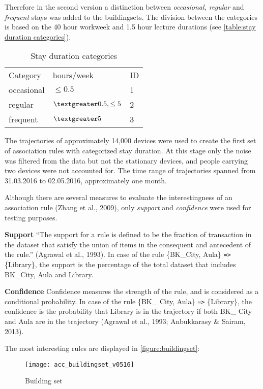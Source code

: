 Therefore in the second version a distinction between \textit{occasional,
regular} and \textit{frequent} stays was added to the buildingsets. The division
between the categories is based on the 40 hour workweek and 1.5 hour lecture
durations (see \autoref{table:stay duration categories}). 

\begin{table}[H]
\centering
\captionsetup{justification=centering}
\caption{Stay duration categories}
\label{table:stay duration categories}
\begin{tabular}{lll}
\cline{1-3}
Category   & hours/week           	& ID \\ \cline{1-3}
occasional & $\leq 0.5$             	& 1  \\
regular	& $\textgreater 0.5, \leq 5$ & 2  \\
frequent   & $\textgreater 5$       	& 3
\end{tabular}
\end{table}

The trajectories of approximately 14,000 devices were used to create the first set of association rules with categorized stay duration. At this stage only the noise was filtered from the data but not the stationary devices, and people carrying two devices were not accounted for. The time range of trajectories spanned from 31.03.2016 to 02.05.2016, approximately one month.

Although there are several measures to evaluate the interestingness of an association rule  (Zhang et al., 2009), only \textit{support} and \textit{confidence} were used for testing purposes. 

\textbf{Support}
“The support for a rule is defined to be the fraction of transaction in the dataset that satisfy the union of items in the consequent and antecedent of the rule.” (Agrawal et al., 1993). In case of the rule \{BK\_City, Aula\} \verb|=>| \{Library\}, the support is the percentage of the total dataset that includes BK\_City, Aula and Library.

\textbf{Confidence}
Confidence measures the strength of the rule, and is considered as a conditional probability. In case of the rule \{BK\_ City, Aula\} \verb|=>| \{Library\}, the confidence is the probability that Library is in the trajectory if both BK\_ City and Aula are in the trajectory (Agrawal et al., 1993; Anbukkarasy \& Sairam, 2013).

The most interesting rules are displayed in \autoref{figure:buildingset}:
\begin{figure}[H]
\centering
\texttt{[image: acc\_buildingset\_v0516]}
\captionsetup{justification=centering}
\caption{Building set}
\label{figure:buildingset}
\end{figure}

